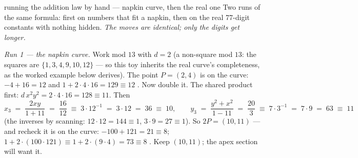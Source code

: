 \begin{worked}{running the addition law by hand --- napkin curve, then the real one}
Two runs of the same formula: first on numbers that fit a napkin, then on
the real 77-digit constants with nothing hidden. \emph{The moves are
identical; only the digits get longer.}

\emph{Run 1 --- the napkin curve.} Work mod $13$ with $d = 2$ (a
non-square mod $13$: the squares are $\{1,3,4,9,10,12\}$ --- so this toy
inherits the real curve's completeness, as the worked example below
derives). The point $P = (2,4)$ is on the curve: $-4 + 16 = 12$ and
$1 + 2\cdot 4\cdot 16 = 129 \equiv 12$ \checkmark. Now double it. The
shared product first: $d\,x^2 y^2 = 2 \cdot 4 \cdot 16 = 128 \equiv 11$.
Then
\[
x_3 \;=\; \frac{2xy}{1 + 11} \;=\; \frac{16}{12} \;\equiv\; 3 \cdot 12^{-1}
\;=\; 3\cdot 12 \;=\; 36 \;\equiv\; 10,
\qquad
y_3 \;=\; \frac{y^2\!+\!x^2}{1 - 11} \;=\; \frac{20}{3} \;\equiv\; 7\cdot 3^{-1}
\;=\; 7 \cdot 9 \;=\; 63 \;\equiv\; 11
\]
(the inverses by scanning: $12\cdot 12 = 144 \equiv 1$, $3\cdot 9 = 27
\equiv 1$). So $2P = (10, 11)$ --- and recheck it is on the curve:
$-100+121 = 21 \equiv 8$; $1 + 2\cdot(100\cdot 121) \equiv 1 + 2\cdot(9
\cdot 4) = 73 \equiv 8$ \checkmark. Keep $(10,11)$; the apex section will
want it.


\end{worked}
